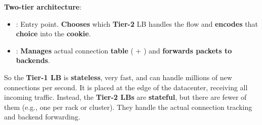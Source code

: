 \highspace
\textcolor{Green3}{ \textbf{Two-tier architecture}}:
\begin{itemize}
    \item {}: Entry point. \textbf{Chooses} which \textbf{Tier-2} LB handles the flow and \textbf{encodes} that \textbf{choice} into the \textbf{cookie}.
    \item {}: \textbf{Manages} actual connection \textbf{table} ( $+$ ) and \textbf{forwards packets to backends}.
\end{itemize}
So the \textbf{Tier-1 LB} is \textbf{stateless}, very fast, and can handle millions of new connections per second. It is placed at the edge of the datacenter, receiving all incoming traffic. Instead, the \textbf{Tier-2 LBs} are \textbf{stateful}, but there are fewer of them (e.g., one per rack or cluster). They handle the actual connection tracking and backend forwarding.

